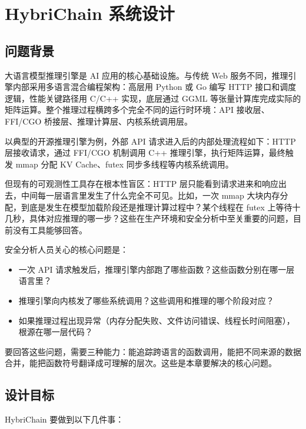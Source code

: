 
\chapter{HybriChain 系统设计}
\label{chap:design}

\section{问题背景}

大语言模型推理引擎是 AI 应用的核心基础设施。与传统 Web 服务不同，推理引擎内部采用多语言混合编程架构：高层用 Python 或 Go 编写 HTTP 接口和调度逻辑，性能关键路径用 C/C++ 实现，底层通过 GGML 等张量计算库完成实际的矩阵运算。整个推理过程横跨多个完全不同的运行时环境：API 接收层、FFI/CGO 桥接层、推理计算层、内核系统调用层。

以典型的开源推理引擎为例，外部 API 请求进入后的内部处理流程如下：HTTP 层接收请求，通过 FFI/CGO 机制调用 C++ 推理引擎，执行矩阵运算，最终触发 mmap 分配 KV Cache、futex 同步多线程等内核系统调用。

但现有的可观测性工具存在根本性盲区：HTTP 层只能看到请求进来和响应出去，中间每一层语言里发生了什么完全不可见。比如，一次 mmap 大块内存分配，到底是发生在模型加载阶段还是推理计算过程中？某个线程在 futex 上等待十几秒，具体对应推理的哪一步？这些在生产环境和安全分析中至关重要的问题，目前没有工具能够回答。

安全分析人员关心的核心问题是：
\begin{itemize}
    \item 一次 API 请求触发后，推理引擎内部跑了哪些函数？这些函数分别在哪一层语言里？
    \item 推理引擎向内核发了哪些系统调用？这些调用和推理的哪个阶段对应？
    \item 如果推理过程出现异常（内存分配失败、文件访问错误、线程长时间阻塞），根源在哪一层代码？
\end{itemize}

要回答这些问题，需要三种能力：能追踪跨语言的函数调用，能把不同来源的数据合并，能把函数符号翻译成可理解的层次。这些是本章要解决的核心问题。

\section{设计目标}

HybriChain 要做到以下几件事：

